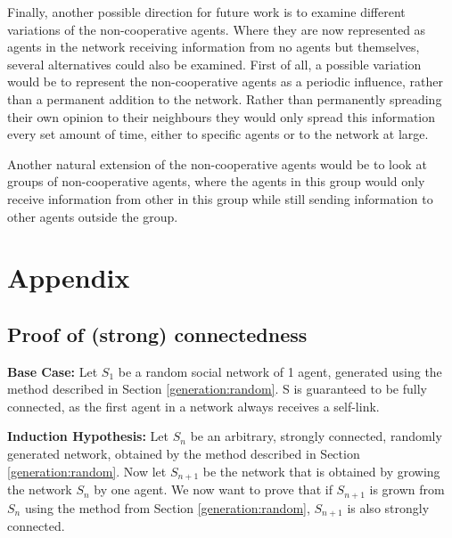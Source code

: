 \documentclass[a4paper, 12pt]{report}
\begin{document}
\noindent Finally, another possible direction for future work is to examine different variations of the non-cooperative agents. Where they are now represented as agents in the network receiving information from no agents but themselves, several alternatives could also be examined. First of all, a possible variation would be to represent the non-cooperative agents as a periodic influence, rather than a permanent addition to the network. Rather than permanently spreading their own opinion to their neighbours they would only spread this information every set amount of time, either to specific agents or to the network at large. 

\noindent Another natural extension of the non-cooperative agents would be to look at groups of non-cooperative agents, where the agents in this group would only receive information from other in this group while still sending information to other agents outside the group.

\newpage

\printbibliography

\newpage

\chapter{Appendix}
\section{Proof of (strong) connectedness}
\label{proof:conn}
\textbf{Base Case:} \newline
Let $S_1$ be a random social network of 1 agent, generated using the method described in Section \ref{generation:random}.
S is guaranteed to be fully connected, as the first agent in a network always receives a self-link.\newline

\textbf{Induction Hypothesis:}\newline
Let $S_n$ be an arbitrary, strongly connected, randomly generated network, obtained by the method described in Section \ref{generation:random}. Now let $S_{n+1}$ be the network that is obtained by growing the network $S_n$ by one agent. We now want to prove that if $S_{n+1}$ is grown from $S_n$ using the method from Section \ref{generation:random}, $S_{n+1}$ is also strongly connected.\newline
\end{document}
